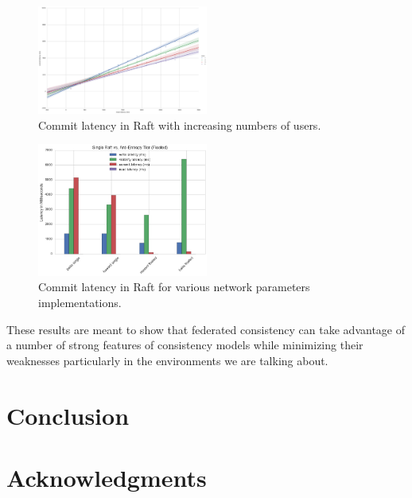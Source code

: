 \documentclass[letterpaper,twocolumn,10pt]{article}
\begin{document}
\begin{figure}[h]
    \centering
    \includegraphics[width=0.5\textwidth]{figures/raft_commit_latency}
    \caption{Commit latency in Raft with increasing numbers of users.}
    \label{fig:raft_commit_latency}
\end{figure}

\begin{figure}[h]
    \centering
    \includegraphics[width=0.5\textwidth]{figures/raft_latencies}
    \caption{Commit latency in Raft for various network parameters implementations.}
    \label{fig:raft_latencies}
\end{figure}

These results are meant to show that federated consistency can take advantage of a number of strong features of consistency models while minimizing their weaknesses particularly in the environments we are talking about.

\section{Conclusion}


\section*{Acknowledgments}

{\footnotesize 
}

\end{document}
